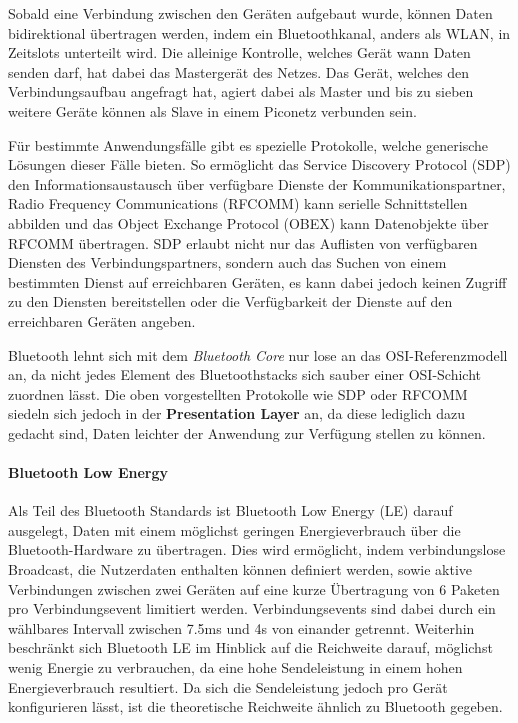         Sobald eine Verbindung zwischen den Geräten aufgebaut wurde, können Daten bidirektional übertragen werden, indem ein Bluetoothkanal, anders als WLAN, in Zeitslots unterteilt wird.
        Die alleinige Kontrolle, welches Gerät wann Daten senden darf, hat dabei das Mastergerät des Netzes. Das Gerät, welches den Verbindungsaufbau angefragt hat,
        agiert dabei als Master und bis zu sieben weitere Geräte können als Slave in einem Piconetz verbunden sein.\cite[S.379f.]{Sauter}

        Für bestimmte Anwendungsfälle gibt es spezielle Protokolle, welche generische Lösungen dieser Fälle bieten.
        So ermöglicht das Service Discovery Protocol (SDP) den Informationsaustausch über verfügbare Dienste der Kommunikationspartner,
        Radio Frequency Communications (RFCOMM) kann serielle Schnittstellen abbilden und das Object Exchange Protocol (OBEX) kann Datenobjekte über RFCOMM übertragen.\cite[S.229]{Lueders}
        SDP erlaubt nicht nur das Auflisten von verfügbaren Diensten des Verbindungspartners, sondern auch das Suchen von einem bestimmten Dienst auf erreichbaren Geräten,
        es kann dabei jedoch keinen Zugriff zu den Diensten bereitstellen oder die Verfügbarkeit der Dienste auf den erreichbaren Geräten angeben.\cite[S.395f]{Morrow}

        Bluetooth lehnt sich mit dem {\it Bluetooth Core} nur lose an das OSI-Referenzmodell an, da nicht jedes Element des Bluetoothstacks sich sauber einer OSI-Schicht zuordnen lässt.
        Die oben vorgestellten Protokolle wie SDP oder RFCOMM siedeln sich jedoch in der {\bf Presentation Layer} an, da diese lediglich dazu gedacht sind,
        Daten leichter der Anwendung zur Verfügung stellen zu können.\cite[S.382]{Sauter}

        \paragraph{Bluetooth Low Energy}
        Als Teil des Bluetooth Standards ist Bluetooth Low Energy (LE) darauf ausgelegt, Daten mit einem möglichst geringen Energieverbrauch über die Bluetooth-Hardware zu übertragen.
        Dies wird ermöglicht, indem verbindungslose Broadcast, die Nutzerdaten enthalten können definiert werden, sowie aktive Verbindungen zwischen zwei Geräten auf eine kurze Übertragung von 6 Paketen pro Verbindungsevent limitiert werden. Verbindungsevents sind dabei durch ein wählbares Intervall zwischen 7.5ms und 4s von einander getrennt. Weiterhin beschränkt sich Bluetooth LE im Hinblick auf die Reichweite darauf, möglichst wenig Energie zu verbrauchen, da eine hohe Sendeleistung in einem hohen Energieverbrauch resultiert. Da sich die Sendeleistung jedoch pro Gerät konfigurieren lässt, ist die theoretische Reichweite ähnlich zu Bluetooth gegeben.\cite[S.7f.]{Townsend}

